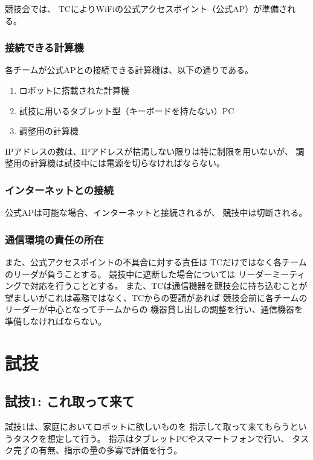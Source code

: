 \documentclass[a4j]{jarticle}
\begin{document}
競技会では、
TCによりWiFiの公式アクセスポイント（公式AP）が準備される。

\subsubsection{接続できる計算機}

各チームが公式APとの接続できる計算機は、以下の通りである。

\begin{enumerate}
	\item ロボットに搭載された計算機
	\item 試技に用いるタブレット型（キーボードを持たない）PC
	\item 調整用の計算機
\end{enumerate}
IPアドレスの数は、IPアドレスが枯渇しない限りは特に制限を用いないが、
調整用の計算機は試技中には電源を切らなければならない。


\subsubsection{インターネットとの接続}

公式APは可能な場合、インターネットと接続されるが、
競技中は切断される。

\subsubsection{通信環境の責任の所在}

また、公式アクセスポイントの不具合に対する責任は
TCだけではなく各チームのリーダが負うことする。
競技中に遮断した場合については
リーダーミーティングで対応を行うこととする。
また、TCは通信機器を競技会に持ち込むことが
望ましいがこれは義務ではなく、TCからの要請があれば
競技会前に各チームのリーダーが中心となってチームからの
機器貸し出しの調整を行い、通信機器を準備しなければならない。


\section{試技}


\subsection{試技1: これ取って来て}

試技1は、家庭においてロボットに欲しいものを
指示して取って来てもらうというタスクを想定して行う。
指示はタブレットPCやスマートフォンで行い、
タスク完了の有無、指示の量の多寡で評価を行う。
\end{document}
